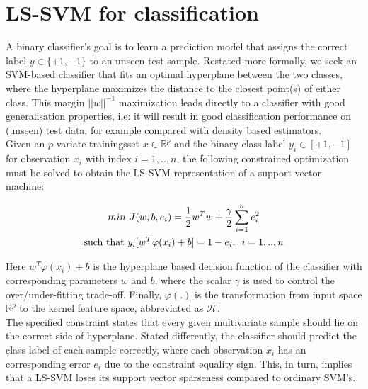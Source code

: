 \documentclass[preprint,12pt]{elsarticle}
\begin{document}
	
	\section{LS-SVM for classification}
	A binary classifier's goal is to learn a prediction model that assigns the correct label $y \in \{+1, -1\}$ to an unseen test sample. Restated more formally, we seek an SVM-based classifier that fits an optimal hyperplane between the two classes, where the hyperplane maximizes the distance to the closest point(s) of either class. This margin $||w||^{-1}$ maximization leads directly to a classifier with good generalisation properties, i.e: it will result in good classification performance on (unseen) test data, for example compared with density based estimators. \\
	
	
	Given an $p$-variate trainingsset $x \in \mathbb{R}^p$ and the binary class label $y_i \in[+1,-1]$ for observation $x_i$ with index $i = 1,..,n$, the following constrained optimization must be solved to obtain the LS-SVM representation of a support vector machine:
	
	\begin{gather}
	\label{eq:costfunction}
	min \  J(w,b,e_i) = \frac{1}{2} w^T w + \frac{\gamma}{2} \sum_{i=1}^{n} e_i^2 \\
	\label{eq:lsconstraint}
	\textrm{such that } y_i[w^T \varphi(x_i) + b] = 1-e_i, \enskip i = 1,..,n
	\end{gather}
	
	Here $w^T \varphi(x_i) + b$ is the hyperplane based decision function of the classifier with corresponding parameters $w$ and $b$, where the scalar $\gamma$ is used to control the over/under-fitting trade-off. Finally,  $\varphi(.)$ is the transformation from input space $\mathbb{R}^p$ to the kernel feature space, abbreviated as $\mathcal{H}$. \\
	
	The specified constraint states that every given multivariate sample should lie on the correct side of hyperplane. Stated differently, the classifier should predict the class label of each sample correctly, where each observation $x_i$ has an corresponding error $e_i$ due to the constraint equality sign. This, in turn, implies that a LS-SVM loses its support vector sparseness compared to ordinary SVM's. \\
	
\end{document}
